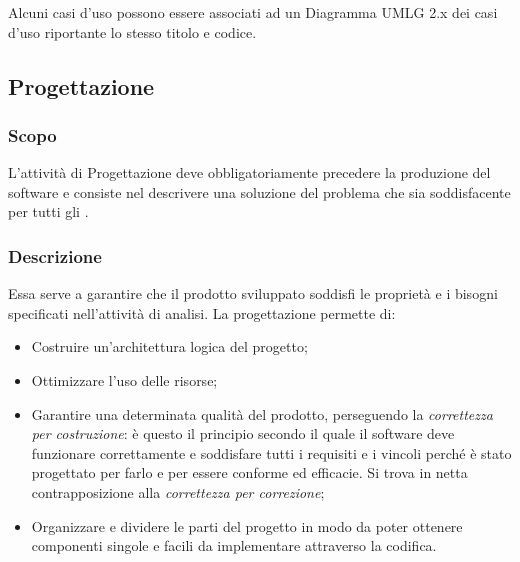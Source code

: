 \documentclass[../NomeDocumento.tex]{subfiles}
\begin{document}
	Alcuni casi d'uso possono essere associati ad un Diagramma UMLG 2.x dei casi d'uso
	riportante lo stesso titolo e codice.
	


	
	
\subsection{Progettazione} 

	\subsubsection{Scopo} 

	L'attività di Progettazione deve obbligatoriamente precedere la produzione del software e consiste nel descrivere una soluzione del problema che sia soddisfacente per tutti gli .
	
	\subsubsection{Descrizione}
	
	Essa serve a garantire che il prodotto sviluppato soddisfi le proprietà e i bisogni specificati nell'attività di analisi. La progettazione permette di:
	
	\begin{itemize}
		\item Costruire un’architettura logica del progetto;
		\item Ottimizzare l’uso delle risorse;
		\item Garantire una determinata qualità del prodotto, perseguendo la \textit{correttezza per costruzione}: è questo il principio secondo il quale il software deve funzionare correttamente e soddisfare tutti i requisiti e i vincoli perché è stato progettato per farlo e per essere conforme ed efficacie. Si trova in netta contrapposizione alla \textit{correttezza per
		correzione};
		\item Organizzare e dividere le parti del progetto in modo da poter ottenere componenti singole e facili da implementare attraverso la codifica. 
	\end{itemize}
\end{document}
